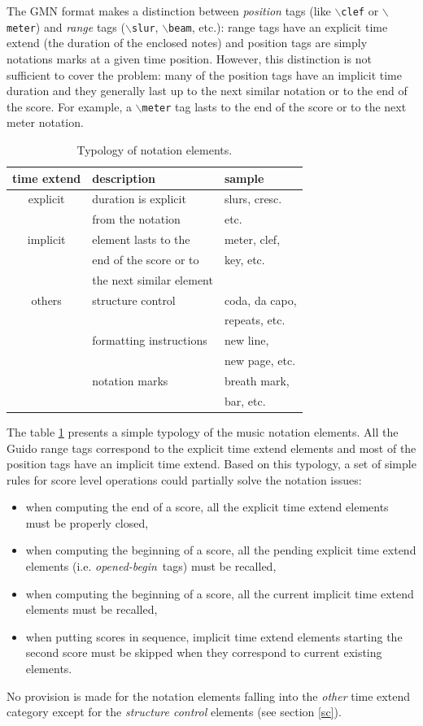 \documentclass[twoside,10pt,a4paper]{article}
\newcommand{\code}[1]	{{\small \texttt{#1}}}
\newcommand{\gtag}[1]	{$\backslash$\code{#1}}
\newcommand{\obeg}		{\emph{opened-begin}}
\begin{document}
The GMN format makes a distinction between \emph{position} tags (like \gtag{clef} or \gtag{meter}) and \emph{range} tags (\gtag{slur}, \gtag{beam}, etc.): range tags have an explicit time extend (the duration of the enclosed notes) and position tags are simply notations marks at a given time position. However, this distinction is not sufficient to cover the problem: many of the position tags have an implicit time duration and they generally last up to the next similar notation or to the end of the score. For example, a \gtag{meter} tag lasts to the end of the score or to the next meter notation.
\begin{table}[htdp]
\caption{Typology of notation elements.}
\begin{center}
\begin{tabular}{cll}
time extend & description & sample \\
\hline
explicit 	& duration is explicit 	& slurs, cresc. \\
			& from the notation		& etc. \\
implicit 	& element lasts to the	& meter, clef, \\
			& end of the score or to	& key, etc. \\
			& the next similar element	& \\
others 		& structure control	& coda, da capo, \\
			& 	& repeats, etc. \\
	 		& formatting instructions	& new line, \\
			& 	& new page, etc. \\
	 		& notation marks	& breath mark, \\
			& 	& bar, etc. \\
\hline
\end{tabular}
\end{center}
\label{types}
\end{table}
The table \ref{types} presents a simple typology of the music notation elements.
All the Guido range tags correspond to the explicit time extend elements and most of the position tags have an implicit time extend. Based on this typology, a set of simple rules for score level operations could partially solve the notation issues:
\begin{itemize}
\item when computing the end of a score, all the explicit time extend elements must be properly closed,
\item when computing the beginning of a score, all the pending explicit time extend elements (i.e. \obeg\ tags) must be recalled,
\item when computing the beginning of a score, all the current implicit time extend elements must be recalled,
\item when putting scores in sequence, implicit time extend elements starting the second score must be skipped when they correspond to current existing elements.
\end{itemize}
No provision is made for the notation elements falling into the \emph{other} time extend category except for the \emph{structure control} elements (see section \ref{sc}).
\end{document}
